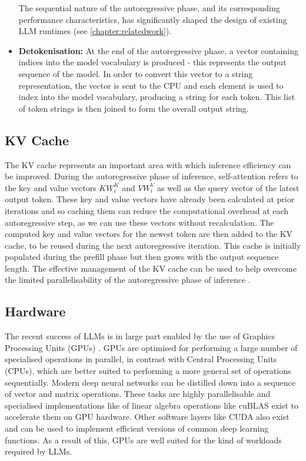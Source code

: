 \documentclass[11pt,twoside]{report}
\begin{document}
\begin{itemize}
    The sequential nature of the autoregressive phase, and its corresponding performance characteristics, has significantly shaped the design of existing LLM runtimes (see \ref{chapter:relatedwork}).
  \item \textbf{Detokenisation:}
    At the end of the autoregressive phase, a vector containing indices into the model vocabulary is produced - this represents the output sequence of the model.
    In order to convert this vector to a string representation, the vector is sent to the CPU and each element is used to index into the model vocabulary, producing a string for each token.
    This list of token strings is then joined to form the overall output string.
\end{itemize}

\subsection{KV Cache}\label{subsection:kvcache}
The KV cache represents an important area with which inference efficiency can be improved.
During the autoregressive phase of inference, self-attention refers to the key and value vectors $KW_i^K$ and $VW_i^V$ as well as the query vector of the latest output token.
These key and value vectors have already been calculated at prior iterations and so caching them can reduce the computational overhead at each autoregressive step, as we can use these vectors without recalculation.
The computed key and value vectors for the newest token are then added to the KV cache, to be reused during the next autoregressive iteration.
This cache is initially populated during the prefill phase but then grows with the output sequence length. 
The effective management of the KV cache can be used to help overcome the limited parallelisability of the autoregressive phase of inference \cite{shi2024keep} \cite{pope2023efficiently}.

\subsection{Hardware}
The recent success of LLMs is in large part enabled by the use of Graphics Processing Units (GPUs) \cite{krizhevsky2012imagenet}.
GPUs are optimised for performing a large number of specialised operations in parallel, in contrast with Central Processing Units (CPUs), which are better suited to performing a more general set of operations sequentially.
Modern deep neural networks can be distilled down into a sequence of vector and matrix operations.
These tasks are highly parallelisable and specialised implementations like of linear algebra operations like cuBLAS \cite{cublas} exist to accelerate them on GPU hardware.
Other software layers like CUDA \cite{nickolls2008scalable} also exist and can be used to implement efficient versions of common deep learning functions.  
As a result of this, GPUs are well suited for the kind of workloads required by LLMs. 
\end{document}
